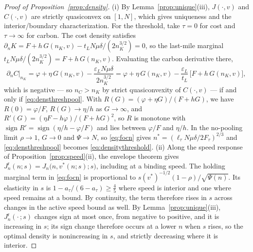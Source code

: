\documentclass[11pt]{article}
\numberwithin{proposition}{section}
\theoremstyle{definition}
\theoremstyle{remark}
\theoremstyle{plain}
\begin{document}
\begin{proof}[Proof of Proposition~\ref{prop:density}]
(i) By Lemma~\ref{prop:unique}(iii), $J(\cdot,v)$ and $C(\cdot,v)$ are strictly quasiconvex on $[1,N]$, which
gives uniqueness and the interior/boundary characterization. For the threshold, take $\tau=0$ for cost and
$\tau\to\infty$ for carbon. The cost density satisfies $\partial_n K=F+h\,G(n_K,v)-
t_L N\mu\delta/(2n_K^{3/2})=0$, so the last-mile marginal $t_L N\mu\delta/(2n_K^{3/2})=F+h\,G(n_K,v)$.
Evaluating the carbon derivative there,
\[
  \partial_n C\big|_{n_K}
  =\varphi+\eta\,G(n_K,v)-\frac{\varepsilon_L N\mu\delta}{2n_K^{3/2}}
  =\varphi+\eta\,G(n_K,v)-\frac{\varepsilon_L}{t_L}\,\big[F+h\,G(n_K,v)\big],
\]
which is negative --- so $n_C>n_K$ by strict quasiconvexity of $C(\cdot,v)$ --- if and only if
\eqref{eq:densthreshpool}. With $R(G)=(\varphi+\eta G)/(F+hG)$, we have $R(0)=\varphi/F$, $R(G)\to\eta/h$ as $G\to\infty$, and
$R'(G)=(\eta F-h\varphi)/(F+hG)^2$, so $R$ is monotone with $\operatorname{sign}R'=\operatorname{sign}
(\eta/h-\varphi/F)$ and lies between $\varphi/F$ and $\eta/h$. In the no-pooling limit $\rho\to1$, $G\to0$ and $\Psi\to N$, so
\eqref{eq:focn} gives $n^*=(\ell_\tau N\mu\delta/2F_\tau)^{2/3}$ and \eqref{eq:densthreshpool} becomes \eqref{eq:densitythreshold}.
(ii) Along the speed response of Proposition~\ref{prop:speed}(ii), the envelope theorem gives
$J^{\mathrm r}_n(n;s)=J_n\big(n,v^*(n;s);s\big)$, including at a binding speed. The holding marginal term in
\eqref{eq:focn} is proportional to $s(v^*)^{-1/2}(1-\rho)/\sqrt{\Psi(n)}$. Its elasticity in $s$ is
$1-a_\tau/(6-a_\tau)\ge\tfrac45$ where speed is interior and one where speed remains at a bound. By continuity,
the term therefore rises in $s$ across changes in the active speed bound as well. By Lemma~\ref{prop:unique}(iii),
$J^{\mathrm r}_n(\cdot\,;s)$ changes sign at most once, from negative to positive, and it is increasing in $s$; its
sign change therefore occurs at a lower $n$ when $s$ rises, so the optimal density is nonincreasing in $s$, and
strictly decreasing where it is interior.
\end{proof}
\end{document}
